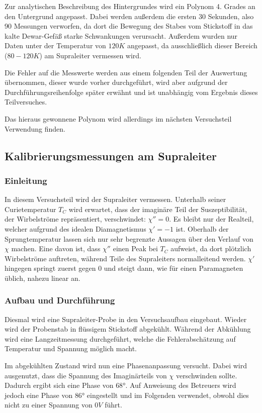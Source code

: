 \documentclass{../Misc/MontavonLaTeX/Montavon}
\begin{document}
Zur analytischen Beschreibung des Hintergrundes wird ein Polynom 4. Grades an den Untergrund angepasst. Dabei werden außerdem die ersten 30 Sekunden, also 90 Messungen verworfen, da dort die Bewegung des Stabes vom Stickstoff in das kalte Dewar-Gefäß starke Schwankungen verursacht. Außerdem wurden nur Daten unter der Temperatur von $120 \unit{K}$ angepasst, da ausschließlich dieser Bereich ($80 - 120 \unit{K}$) am Supraleiter vermessen wird. 

Die Fehler auf die Messwerte werden aus einem folgenden Teil der Auswertung übernommen, dieser wurde vorher durchgeführt, wird aber aufgrund der Durchführungsreihenfolge später erwähnt und ist unabhängig vom Ergebnis dieses Teilversuches.

Das hieraus gewonnene Polynom wird allerdings im nächsten Versuchsteil Verwendung finden.

\subsection{Kalibrierungsmessungen am Supraleiter}
\subsubsection{Einleitung}
In diesem Versuchsteil wird der Supraleiter vermessen. Unterhalb seiner Curietemperatur $T_C$ wird erwartet, dass der imaginäre Teil der Suszeptibilität, der Wirbelströme repräsentiert, verschwindet: $\chi'' = 0$. Es bleibt nur der Realteil, welcher aufgrund des idealen Diamagnetismus $\chi' = -1$ ist. Oberhalb der Sprungtemperatur lassen sich nur sehr begrenzte Aussagen über den Verlauf von $\chi$ machen. Eine davon ist, dass $\chi''$ einen Peak bei $T_C$ aufweist, da dort plötzlich Wirbelströme auftreten, während Teile des Supraleiters normalleitend werden. $\chi'$ hingegen springt zuerst gegen $0$ und steigt dann, wie für einen Paramagneten üblich, nahezu linear an.

\subsubsection{Aufbau und Durchführung}
Diesmal wird eine Supraleiter-Probe in den Versuchsaufbau eingebaut. Wieder wird der Probenstab in flüssigem Stickstoff abgekühlt. Während der Abkühlung wird eine Langzeitmessung durchgeführt, welche die Fehlerabschätzung auf Temperatur und Spannung möglich macht.

Im abgekühlten Zustand wird nun eine Phasenanpassung versucht. Dabei wird ausgenutzt, dass die Spannung des Imaginärteils von $\chi$ verschwinden sollte. Dadurch ergibt sich eine Phase von $68 \unit{\degree}$. Auf Anweisung des Betreuers wird jedoch eine Phase von $86 \unit{\degree}$ eingestellt und im Folgenden verwendet, obwohl dies nicht zu einer Spannung von $0 \unit{V}$ führt.
\end{document}

